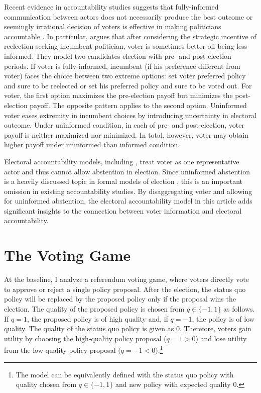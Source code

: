\documentclass[letterpaper, 12pt]{article}
\begin{document}
    \par Recent evidence in accountability studies suggests that fully-informed communication between actors does not necessarily produce the best outcome \citep{Ashworth2014isvo, Prato2016thvo, Patty2017expo} or 
    seemingly irrational decision of voters is effective in making politicians accountable \citep{Gailmard2018prpr}. In particular, \cite{Ashworth2014isvo} argues that after considering the strategic incentive of reelection seeking incumbent politician, voter is sometimes better off being less informed. They model two candidates election with pre- and post-election periods. If voter is fully-informed, incumbent (if his preference different from voter) faces the choice between two extreme options: set voter preferred policy and sure to be reelected or set his preferred policy and sure to be voted out. For voter, the first option maximizes the pre-election payoff but minimizes the post-election payoff. The opposite pattern applies to the second option. Uninformed voter eases extremity in incumbent choices by introducing uncertainty in electoral outcome. Under uninformed condition, in each of pre- and post-election, voter payoff is neither maximized nor minimized. In total, however, voter may obtain higher payoff under uninformed than informed condition.
        
    \par Electoral accountability models, including \cite{Ashworth2014isvo}, treat voter as one representative actor and thus cannot allow abstention in election. Since uninformed abstention is a heavily discussed topic in formal models of election \citep{Matsusaka1995exvo, Feddersen1996thsw, Feddersen1999abin}, this is an important omission in existing accountability studies. By disaggregating voter and allowing for uninformed abstention, the electoral accountability model in this article adds significant insights to the connection between voter information and electoral accountability.
    
    \section*{The Voting Game}
    
    \par At the baseline, I analyze a referendum voting game, where voters directly vote to approve or reject a single policy proposal. After the election, the status quo policy will be replaced by the proposed policy only if the proposal wins the election. The quality of the proposed policy is chosen from $q \in \{-1, 1\}$ as follows. If $q=1$, the proposed policy is of high quality and, if $q=-1$, the policy is of low quality. The quality of the status quo policy is given as $0$. Therefore, voters gain utility by choosing the high-quality policy proposal ($q=1>0$) and lose utility from the low-quality policy proposal ($q=-1<0$).\footnote{The model can be equivalently defined with the status quo policy with quality chosen from $q \in \{-1, 1\}$ and new policy with expected quality $0$.}
    
\end{document}
